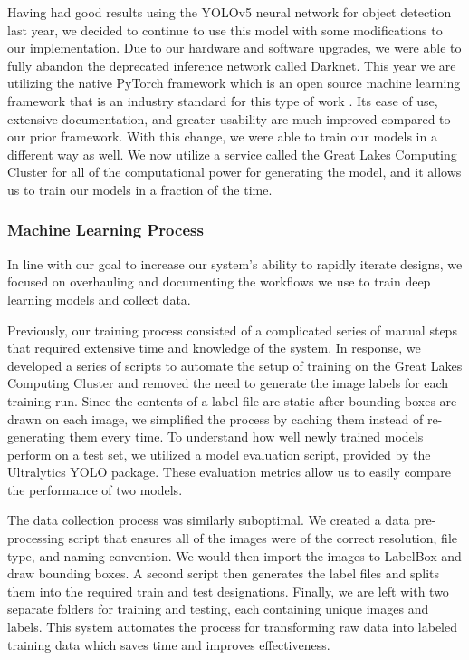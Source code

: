 \documentclass[conference]{IEEEtran}
\begin{document}
Having had good results using the YOLOv5 neural network \cite{b3} for object detection last year, we decided to continue to use this model with some modifications to our implementation. Due to our hardware and software upgrades, we were able to fully abandon the deprecated inference network called Darknet. This year we are utilizing the native PyTorch framework which is an open source machine learning framework that is an industry standard for this type of work \cite{b4}. Its ease of use, extensive documentation, and greater usability are much improved compared to our prior framework. With this change, we were able to train our models in a different way as well. We now utilize a service called the Great Lakes Computing Cluster for all of the computational power for generating the model, and it allows us to train our models in a fraction of the time.

\subsubsection{Machine Learning Process}
\label{sssec:ml_flow}
In line with our goal to increase our system’s ability to rapidly iterate designs, we focused on overhauling and documenting the workflows we use to train deep learning models and collect data. 

Previously, our training process consisted of a complicated series of manual steps that required extensive time and knowledge of the system. In response, we developed a series of scripts to automate the setup of training on the Great Lakes Computing Cluster and removed the need to generate the image labels for each training run. Since the contents of a label file are static after bounding boxes are drawn on each image, we simplified the process by caching them instead of re-generating them every time. To understand how well newly trained models perform on a test set, we utilized a model evaluation script, provided by the Ultralytics YOLO package. These evaluation metrics allow us to easily compare the performance of two models.

The data collection process was similarly suboptimal. We created a data pre-processing script that ensures all of the images were of the correct resolution, file type, and naming convention. We would then import the images to LabelBox and draw bounding boxes. A second script then generates the label files and splits them into the required train and test designations. Finally, we are left with two separate folders for training and testing, each containing unique images and labels. This system automates the process for transforming raw data into labeled training data which saves time and improves effectiveness.
\end{document}
